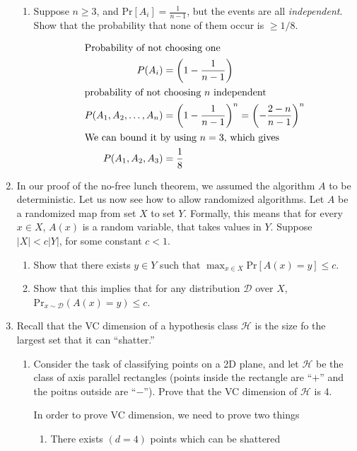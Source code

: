 \documentclass[12pt]{article}
\newcommand{\abs}[1]{\left| #1 \right|}
\renewcommand{\Pr}[1]{\text{Pr}[ #1 ]}
\begin{document}
\begin{enumerate}
\begin{enumerate}
\item Suppose $n \geq 3$, and $\Pr{A_{i}} = \frac{1}{n-1}$, but the events are all {\em independent}. Show that the probability that none of them occur is $\geq 1/8$.

\begin{align*}
\intertext{Probability of not choosing one}
P(A_{i}) &= \left( 1 - \frac{1}{n-1}\right)\\
\intertext{probability of not choosing $n$ independent}
P(A_{1}, A_{2}, \ldots, A_{n}) &= \left( 1 - \frac{1}{n-1}\right)^{n} = \left( - \frac{2-n}{n-1}\right)^{n}\\
\intertext{We can bound it by using $n = 3$, which gives}
P(A_{1}, A_{2}, A_{3}) &= \frac{1}{8}
\end{align*}
\end{enumerate}

\item In our proof of the no-free lunch theorem, we assumed the algorithm $A$ to be deterministic. Let us now see how to allow randomized algorithms. Let $A$ be a randomized map from set $X$ to set $Y$. Formally, this means that for every $x \in X$, $A(x)$ is a random variable, that takes values in $Y$. Suppose $\abs{X} < c\abs{Y}$, for some constant $c < 1$. 

\begin{enumerate}
\item Show that there exists $y \in Y$ such that $\max_{x\in X}\Pr{A(x) = y} \leq c$.
\item Show that this implies that for any distribution $\mathcal{D}$ over $X$, $\text{Pr}_{x\sim \mathcal{D}}(A(x) = y) \leq c$.
\end{enumerate}

\item Recall that the VC dimension of a hypothesis class $\mathcal{H}$ is the size fo the largest set that it can ``shatter.''

\begin{enumerate}
\item Consider the task of classifying points on a 2D plane, and let $\mathcal{H}$ be the class of axis parallel rectangles (points inside the rectangle are ``$+$'' and the poitns outside are ``$-$''). Prove that the VC dimension of $\mathcal{H}$ is 4.

In order to prove VC dimension, we need to prove two things

\begin{enumerate}
\item There exists $(d = 4)$ points which can be shattered


\end{enumerate}
\end{enumerate}
\end{enumerate}
\end{document}

